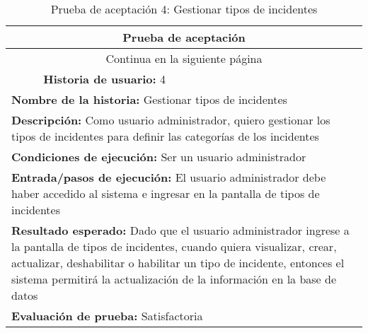 \begin{longtable}{|p{6.7cm}|p{6.7cm}|}
    \caption{Prueba de aceptación 4: Gestionar tipos de incidentes} \label{tab:prueba-4}
    \\
    \hline
    \multicolumn{2}{|c|}{\textbf{Prueba de aceptación}}                                                                                                                         \\
    \hline

    \endfirsthead

    \hline
    \endhead

    \hline
    \multicolumn{2}{|c|}{{Continua en la siguiente página}}                                                                                                                     \\
    \hline
    \endfoot

    \hline
    \endlastfoot
    \multicolumn{1}{|p{6.7cm}|}{\textbf{Número} 4 } & \multicolumn{1}{|p{6.7cm}|}{\textbf{Historia de usuario:} 4}                                                              \\
    \hline
    \multicolumn{2}{|p{13.4cm}|}{\textbf{Nombre de la historia:} Gestionar tipos de incidentes }                                                                                \\
    \hline
    \multicolumn{2}{|p{13.4cm}|}{\textbf{Descripción:} Como usuario administrador, quiero gestionar los tipos de incidentes para definir las categorías de los incidentes}      \\
    \hline
    \multicolumn{2}{|p{13.4cm}|}{\textbf{Condiciones de ejecución:} Ser un usuario administrador}                                                                               \\
    \hline
    \multicolumn{2}{|p{13.4cm}|}{\textbf{Entrada/pasos de ejecución:} El usuario administrador debe haber accedido al sistema e ingresar en la pantalla de tipos de incidentes} \\
    \hline
    \multicolumn{2}{|p{13.4cm}|}{\textbf{Resultado esperado:} Dado que el usuario administrador ingrese a la pantalla de tipos de incidentes, cuando quiera visualizar,
    crear, actualizar, deshabilitar o habilitar un tipo de incidente, entonces el sistema permitirá la actualización de la información en la base de datos}                     \\
    \hline
    \multicolumn{2}{|p{13.4cm}|}{\textbf{Evaluación de prueba:} Satisfactoria}                                                                                                  \\
    \hline
\end{longtable}


